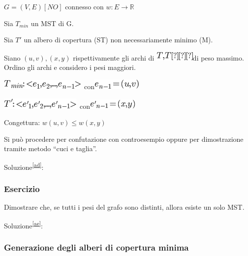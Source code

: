 \documentclass{article}
\begin{document}
$G=(V,E) [NO]$ connesso con $w:E \rightarrow \mathbb{R}$

{Sia $T_{min}$ un MST di G.}

{Sia $T'$ un albero di copertura (ST) non necessariamente minimo (M).}

{Siano $(u,v),(x,y)$ rispettivamente gli archi
di }\includegraphics{images/image475.png}{di peso massimo. Ordino gli
archi e considero i pesi maggiori.}

\includegraphics{images/image476.png}{~con}\includegraphics{images/image477.png}

\includegraphics{images/image478.png}{~con}\includegraphics{images/image479.png}

{Congettura: }$w(u,v) \leq w(x,y)${~}

{Si può procedere per confutazione con controesempio oppure per dimostrazione tramite metodo ``cuci e taglia''.}

{Soluzione}\textsuperscript{\protect\hyperlink{cmnt30}{{[}ad{]}}}{:}

\subsubsection{Esercizio}

{Dimostrare che, se tutti i pesi del grafo sono distinti, allora esiste un solo MST.}

{Soluzione}\textsuperscript{\protect\hyperlink{cmnt31}{{[}ae{]}}}{:}

\hypertarget{h.42rszsg7qe80}{\subsubsection{\texorpdfstring{{Generazione degli alberi di copertura minima}}{Generazione degli alberi di copertura minima}}\label{h.42rszsg7qe80}}

\protect\hypertarget{t.89c877068ffb6efc80378955af5aa00fb054212d}{}{}\protect\hypertarget{t.40}{}{}
\end{document}
